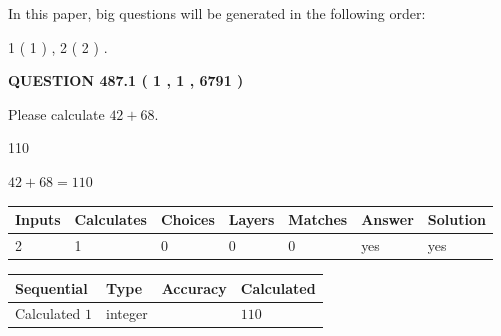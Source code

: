 \documentclass[12pt]{article}
\begin{document}
In this paper, big questions will be generated in the following order: 
   
   
   1 ( 1 )
 ,
   2 ( 2 )
 .
  
\vspace{0.2in}
  
{\textbf{\Large{QUESTION
487.1 
 ( 1 , 1 , 6791 )
}}}
  
  
 
Please calculate $ %
42 +  %
68 $.
 
 
 
\noindent{}
 
 

110
 
 
\noindent{}
 
 

 
 
 
\noindent{}
 
 

$ %
42 +  %
68=   %
110$
 
 
\noindent{}
 
 

 
   
   
   
   
\noindent\begin{tabular}{|l|l|l|l|l|l|l|}
 \hline
Inputs & Calculates & Choices & Layers & Matches & Answer & Solution \\ \hline
 2  & 
 1  & 
 0
  & 
 0  & 
 0  & 
  yes & 
  yes 
  \\ \hline
 \end{tabular}
   
   
   
   
\noindent{}
   
   
  
  
\noindent\begin{tabular}{|l|l|l|l|}
\hline
 Sequential & Type & Accuracy & Calculated \\ 
\hline
 
 
  Calculated $  1 $ & integer &  & 
  $ 110 $ 
 \\  \hline  
 \end{tabular}
   
\end{document}
